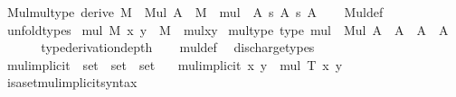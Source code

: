 \begin{isabellebody}
%
\isadelimproof
\isanewline
%
\endisadelimproof
\isanewline
{}\isamarkupfalse%
\ Mul{\isacharunderscore}{\kern0pt}mul{\isacharunderscore}{\kern0pt}type\ {\isacharbrackleft}{\kern0pt}derive{\isacharbrackright}{\kern0pt}{\isacharcolon}{\kern0pt}\ {\isachardoublequoteopen}M\ {\isacharcolon}{\kern0pt}\ Mul\ A\ {\isasymLongrightarrow}\ M\ {\isacharat}{\kern0pt}{\isacharat}{\kern0pt}\ mul\ {\isacharcolon}{\kern0pt}\ A\ {\isasymrightarrow}s\ A\ {\isasymrightarrow}s\ A{\isachardoublequoteclose}\isanewline
%
\isadelimproof
\ \ %
\endisadelimproof
%
\isatagproof
{}\isamarkupfalse%
\ Mul{\isacharunderscore}{\kern0pt}def\ \isamarkupfalse%
\ unfold{\isacharunderscore}{\kern0pt}types%
\endisatagproof
{\isafoldproof}%
%
\isadelimproof
\isanewline
%
\endisadelimproof
\isanewline
{}\isamarkupfalse%
\ {\isachardoublequoteopen}mul\ M\ x\ y\ {\isasymequiv}\ {\isacharparenleft}{\kern0pt}M\ {\isacharat}{\kern0pt}{\isacharat}{\kern0pt}\ mul{\isacharparenright}{\kern0pt}{\isacharbackquote}{\kern0pt}x{\isacharbackquote}{\kern0pt}y{\isachardoublequoteclose}\isanewline
\isanewline
{}\isamarkupfalse%
\ mul{\isacharunderscore}{\kern0pt}type\ {\isacharbrackleft}{\kern0pt}type{\isacharbrackright}{\kern0pt}{\isacharcolon}{\kern0pt}\ {\isachardoublequoteopen}mul\ {\isacharcolon}{\kern0pt}\ Mul\ A\ {\isasymRightarrow}\ A\ {\isasymRightarrow}\ A\ {\isasymRightarrow}\ A{\isachardoublequoteclose}\isanewline
\ \ \isanewline
%
\isadelimproof
\ \ %
\endisadelimproof
%
\isatagproof
{}\isamarkupfalse%
\ {\isacharbrackleft}{\kern0pt}{\isacharbrackleft}{\kern0pt}type{\isacharunderscore}{\kern0pt}derivation{\isacharunderscore}{\kern0pt}depth{\isacharequal}{\kern0pt}{}{\isacharbrackright}{\kern0pt}{\isacharbrackright}{\kern0pt}\isanewline
\ \ \isamarkupfalse%
\ mul{\isacharunderscore}{\kern0pt}def\ \isamarkupfalse%
\ discharge{\isacharunderscore}{\kern0pt}types%
\endisatagproof
{\isafoldproof}%
%
\isadelimproof
\isanewline
%
\endisadelimproof
\isanewline
{}\isamarkupfalse%
\ mul{\isacharunderscore}{\kern0pt}implicit\ {\isacharcolon}{\kern0pt}{\isacharcolon}{\kern0pt}\ {\isachardoublequoteopen}set\ {\isasymRightarrow}\ set\ {\isasymRightarrow}\ set{\isachardoublequoteclose}\isanewline
\ \ \ {\isachardoublequoteopen}mul{\isacharunderscore}{\kern0pt}implicit\ x\ y\ {\isasymequiv}\ mul\ {\isasymimplicit}T\ x\ y{\isachardoublequoteclose}\isanewline
\isanewline
{}\isamarkupfalse%
\ isa{\isacharunderscore}{\kern0pt}set{\isacharunderscore}{\kern0pt}mul{\isacharunderscore}{\kern0pt}implicit{\isacharunderscore}{\kern0pt}syntax\isanewline

\end{isabellebody}
